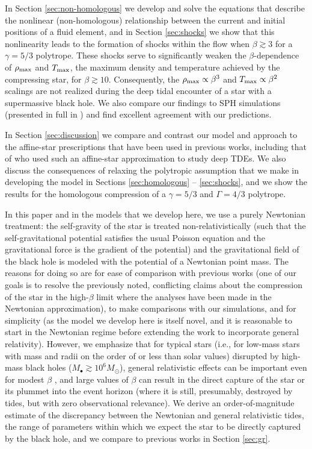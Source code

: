 \documentclass[twocolumn]{aastex62}
\begin{document}
In Section \ref{sec:non-homologous} we develop and solve the equations that describe the nonlinear (non-homologous) relationship between the current and initial positions of a fluid element, and in Section \ref{sec:shocks} we show that this nonlinearity leads to the formation of shocks within the flow when $\beta \gtrsim 3$ for a $\gamma = 5/3$ polytrope. These shocks serve to significantly weaken the $\beta$-dependence of $\rho_{\rm max}$ and $T_{\rm max}$, the maximum density and temperature achieved by the compressing star, for $\beta \gtrsim 10$. Consequently, the $\rho_{\rm max} \propto \beta^3$ and $T_{\rm max} \propto \beta^2$ scalings are not realized during the deep tidal encounter of a star with a supermassive black hole. We also compare our findings to SPH simulations (presented in full in \citealt{norman21}) and find excellent agreement with our predictions. 

In Section \ref{sec:discussion} we compare and contrast our model and approach to the affine-star prescriptions that have been used in previous works, including that of \citet{carter83} who used such an affine-star approximation to study deep TDEs. We also discuss the consequences of relaxing the polytropic assumption that we make in developing the model in Sections \ref{sec:homologous} -- \ref{sec:shocks}, and we show the results for the homologous compression of a $\gamma = 5/3$ and $\Gamma = 4/3$ polytrope. 

In this paper and in the models that we develop here, we use a purely Newtonian treatment: the self-gravity of the star is treated non-relativistically (such that the self-gravitational potential satisfies the usual Poisson equation and the gravitational force is the gradient of the potential) and the gravitational field of the black hole is modeled with the potential of a Newtonian point mass. The reasons for doing so are for ease of comparison with previous works (one of our goals is to resolve the previously noted, conflicting claims about the compression of the star in the high-$\beta$ limit where the analyses have been made in the Newtonian approximation), to make comparisons with our simulations, and for simplicity (as the model we develop here is itself novel, and it is reasonable to start in the Newtonian regime before extending the work to incorporate general relativity). However, we emphasize that for typical stars (i.e., for low-mass stars with mass and radii on the order of or less than solar values) disrupted by high-mass black holes ($M_{\bullet} \gtrsim 10^{6}M_{\odot}$), general relativistic effects can be important even for modest $\beta$ \citep{gafton19}, and large values of $\beta$ can result in the direct capture of the star or its plummet into the event horizon (where it is still, presumably, destroyed by tides, but with zero observational relevance). We derive an order-of-magnitude estimate of the discrepancy between the Newtonian and general relativistic tides, the range of parameters within which we expect the star to be directly captured by the black hole, and we compare to previous works in Section \ref{sec:gr}.
\end{document}
